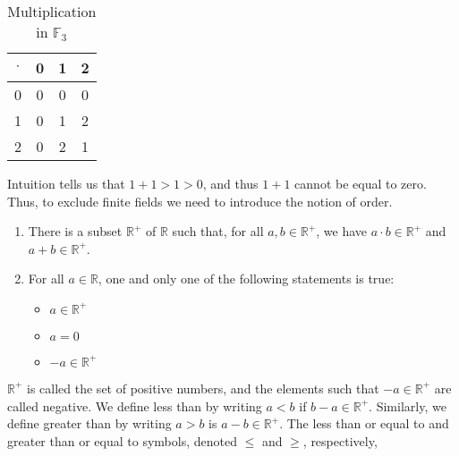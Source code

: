             \hfill
            \begin{minipage}[b]{0.49\textwidth}
                \begin{table}[H]
                    \centering
                    \captionsetup{type=table}
                    \begin{tabular}{c|ccc}
                        $\cdot$&0&1&2\\
                        \hline
                        0&0&0&0\\
                        1&0&1&2\\
                        2&0&2&1
                    \end{tabular}
                    \caption{Multiplication in $\mathbb{F}_{3}$}
                    \label{tab:Real_Analysis_Mult_in_F_3_Field}
                \end{table}
            \end{minipage}
            Intuition tells us that $1+1>1>0$, and thus $1+1$ cannot
            be equal to zero. Thus, to exclude finite fields we
            need to introduce the notion of order.
            \begin{enumerate}
                \item There is a subset $\mathbb{R}^{+}$
                      of $\mathbb{R}$ such that, for all
                      $a,b\in\mathbb{R}^{+}$, we
                      have $a\cdot{b}\in\mathbb{R}^{+}$ and
                      $a+b\in\mathbb{R}^{+}$.
                \item For all $a\in\mathbb{R}$, one and only one of
                      the following statements is true:
                      \begin{itemize}
                          \item $a\in\mathbb{R}^{+}$
                          \item $a=0$
                          \item $\minus{a}\in\mathbb{R}^{+}$
                      \end{itemize}
            \end{enumerate}
            $\mathbb{R}^{+}$ is called the set of positive numbers,
            and the elements such that $\minus{a}\in\mathbb{R}^{+}$
            are called negative. We define less than by writing
            $a<b$ if $b-a\in\mathbb{R}^{+}$. Similarly, we define
            greater than by writing $a>b$ is $a-b\in\mathbb{R}^{+}$.
            The less than or equal to and greater than or equal to
            symbols, denoted $\leq$ and $\geq$, respectively,
